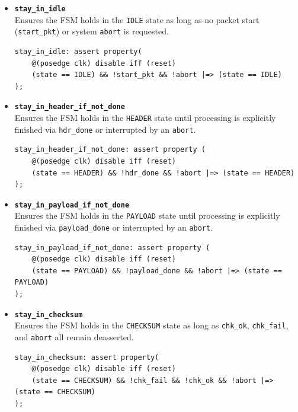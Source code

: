 \documentclass{article}
\begin{document}
\begin{itemize}
    \item \textbf{\texttt{stay\_in\_idle}} \\
    Ensures the FSM holds in the \texttt{IDLE} state as long as no packet start (\texttt{start\_pkt}) or system \texttt{abort} is requested.
    \begin{verbatim}
stay_in_idle: assert property(
    @(posedge clk) disable iff (reset)
    (state == IDLE) && !start_pkt && !abort |=> (state == IDLE)
);
    \end{verbatim}
    
    \item \textbf{\texttt{stay\_in\_header\_if\_not\_done}} \\
    Ensures the FSM holds in the \texttt{HEADER} state until processing is explicitly finished via \texttt{hdr\_done} or interrupted by an \texttt{abort}.
    \begin{verbatim}
stay_in_header_if_not_done: assert property (
    @(posedge clk) disable iff (reset) 
    (state == HEADER) && !hdr_done && !abort |=> (state == HEADER)
);
    \end{verbatim}
    
    \item \textbf{\texttt{stay\_in\_payload\_if\_not\_done}} \\
    Ensures the FSM holds in the \texttt{PAYLOAD} state until processing is explicitly finished via \texttt{payload\_done} or interrupted by an \texttt{abort}.
    \begin{verbatim}
stay_in_payload_if_not_done: assert property (
    @(posedge clk) disable iff (reset) 
    (state == PAYLOAD) && !payload_done && !abort |=> (state == PAYLOAD)
);
    \end{verbatim}
    
    \item \textbf{\texttt{stay\_in\_checksum}} \\
    Ensures the FSM holds in the \texttt{CHECKSUM} state as long as \texttt{chk\_ok}, \texttt{chk\_fail}, and \texttt{abort} all remain deasserted.
    \begin{verbatim}
stay_in_checksum: assert property(
    @(posedge clk) disable iff (reset)
    (state == CHECKSUM) && !chk_fail && !chk_ok && !abort |=> (state == CHECKSUM)
);
    \end{verbatim}
\end{itemize}
\end{document}
